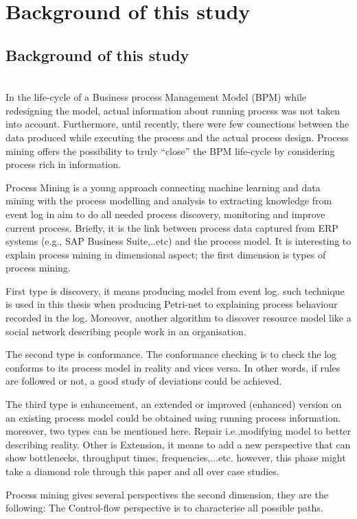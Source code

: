 \chapter{Background of this study}
\section{Background of this study}
\\

In the life-cycle of a Business process Management Model (BPM) while redesigning the model, actual information about running process was not taken into account. Furthermore, until recently, there were few connections between the data produced while executing the process and the actual process design. Process mining offers the possibility to truly “close” the BPM life-cycle by considering process rich in information.

Process Mining is a young approach connecting machine learning and data mining with the process modelling and analysis to extracting knowledge from event log in aim to do all needed process discovery, monitoring and improve current process. Briefly, it is the link between process data captured from ERP systems (e.g., SAP Business Suite,..etc)
and the process model.
It is interesting to explain process mining in dimensional aspect; the first dimension is types of process mining.

First type is discovery, it means producing model from event log. such technique is used in this thesis when producing Petri-net to explaining process behaviour recorded in the log. Moreover, another algorithm to discover resource model like a social network describing people work in an organisation.

The second type is  conformance. The conformance checking is to check the log conforms to its process model in reality
and vices versa. In other words, if rules are followed or not, a good study of deviations could be achieved.

The third type is enhancement, an extended or improved (enhanced) version on an existing process model could be obtained using running process information. moreover, two types can be mentioned here. Repair i.e.,modifying model to better describing reality. Other is Extension, it means to add a new perspective that can show bottlenecks, throughput times, frequencies,...etc. however, this phase might take a diamond role through this paper and all over case studies.

Process mining gives several perspectives the second dimension, they are the following:
The Control-flow perspective is to characterise all possible paths.

